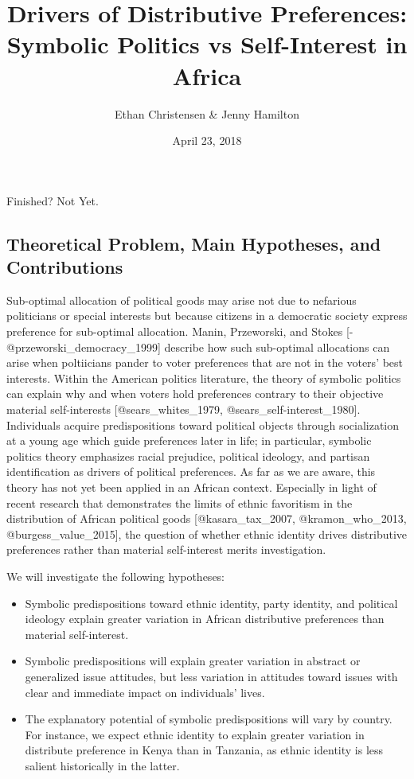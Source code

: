 \documentclass[]{article}
\title{Drivers of Distributive Preferences: Symbolic Politics vs Self-Interest
in Africa}
\author{Ethan Christensen \& Jenny Hamilton}
\date{April 23, 2018}
\begin{document}
\maketitle

Finished? Not Yet.

\subsection{Theoretical Problem, Main Hypotheses, and
Contributions}\label{theoretical-problem-main-hypotheses-and-contributions}

Sub-optimal allocation of political goods may arise not due to nefarious
politicians or special interests but because citizens in a democratic
society express preference for sub-optimal allocation. Manin,
Przeworski, and Stokes {[}-@przeworski\_democracy\_1999{]} describe how
such sub-optimal allocations can arise when poltiicians pander to voter
preferences that are not in the voters' best interests. Within the
American politics literature, the theory of symbolic politics can
explain why and when voters hold preferences contrary to their objective
material self-interests {[}@sears\_whites\_1979,
@sears\_self-interest\_1980{]}. Individuals acquire predispositions
toward political objects through socialization at a young age which
guide preferences later in life; in particular, symbolic politics theory
emphasizes racial prejudice, political ideology, and partisan
identification as drivers of political preferences. As far as we are
aware, this theory has not yet been applied in an African context.
Especially in light of recent research that demonstrates the limits of
ethnic favoritism in the distribution of African political goods
{[}@kasara\_tax\_2007, @kramon\_who\_2013, @burgess\_value\_2015{]}, the
question of whether ethnic identity drives distributive preferences
rather than material self-interest merits investigation.

We will investigate the following hypotheses:

\begin{itemize}
\item Symbolic predispositions toward ethnic identity, party identity, and political ideology explain greater variation in African distributive preferences than material self-interest.
\item Symbolic predispositions will explain greater variation in abstract or generalized issue attitudes, but less variation in attitudes toward issues with clear and immediate impact on individuals' lives.
\item The explanatory potential of symbolic predispositions will vary by country. For instance, we expect ethnic identity to explain greater variation in distribute preference in Kenya than in Tanzania, as ethnic identity is less salient historically in the latter.
\end{itemize}
\end{document}
